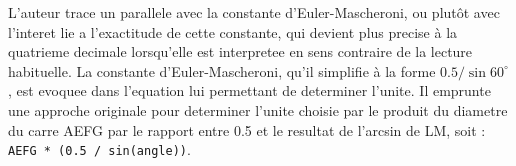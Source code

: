 \documentclass[12pt,a4paper]{article}
\begin{document}
L'auteur trace un parallele avec la constante d'Euler-Mascheroni, 
ou plut\^ot avec l'interet lie a l'exactitude de cette constante, 
qui devient plus precise \`a la quatrieme decimale lorsqu'elle est interpretee 
en sens contraire de la lecture habituelle. 
La constante d'Euler-Mascheroni, qu'il simplifie \`a la forme 
\(0.5 / \sin 60^\circ\), est evoquee dans l'equation lui permettant 
de determiner l'unite. Il emprunte une approche originale pour determiner 
l'unite choisie par le produit du diametre du carre AEFG 
par le rapport entre 0.5 et le resultat de l'arcsin de LM, 
soit : \texttt{AEFG * (0.5 / sin(angle))}.

\vspace{0.8cm}

\end{document}
